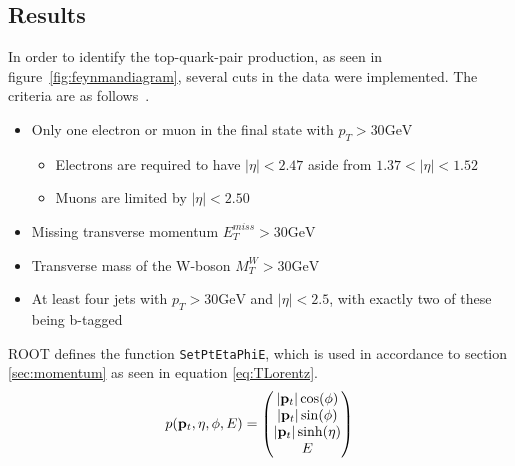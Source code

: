 \documentclass[12pt,a4paper]{article}
\numberwithin{equation}{section}
\begin{document}
\subsection{Results}\label{sec:results}
In order to identify the top-quark-pair production, as seen in
figure~\ref{fig:feynmandiagram}, several cuts in the data were implemented. The
criteria are as follows~\cite{oreach2020}.
\begin{itemize}
  \item Only one electron or muon in the final state with $p_{T} > 30 \mathrm{GeV}$
  \begin{itemize}
    \item Electrons are required to have $|\eta| < 2.47$ aside from $1.37 < |\eta| < 1.52$
    \item Muons are limited by $|\eta| < 2.50$
  \end{itemize}
  \item Missing transverse momentum $E_{T}^{miss} > 30 \mathrm{GeV}$
  \item Transverse mass of the W-boson $M_{T}^{W} > 30 \mathrm{GeV}$
  \item At least four jets with $p_{T} > 30 \mathrm{GeV}$ and $|\eta| < 2.5$, with
        exactly two of these being b-tagged
\end{itemize}

ROOT defines the function \texttt{SetPtEtaPhiE}, which is used in accordance to
section \ref{sec:momentum} as seen in equation \eqref{eq:TLorentz}.
\begin{equation} \label{eq:TLorentz}
p({\vb p_t}, \eta, \phi, E) =
\begin{pmatrix}
|{\vb p_t}| \cos(\phi)\\ |{\vb p_t}|\sin(\phi)\\ |{\vb p_t}| \sinh(\eta)\\ E
\end{pmatrix}
\end{equation}
\end{document}
